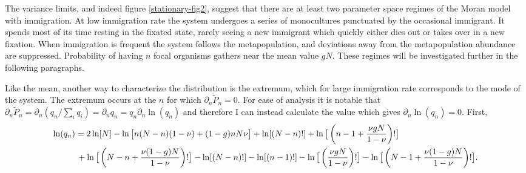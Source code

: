 The variance limits, and indeed figure \ref{stationary-fig2}, suggest that there are at least two parameter space regimes of the Moran model with immigration. 
At low immigration rate the system undergoes a series of monocultures punctuated by the occasional immigrant. It spends most of its time resting in the fixated state, rarely seeing a new immigrant which quickly either dies out or takes over in a new fixation. 
When immigration is frequent the system follows the metapopulation, and deviations away from the metapopulation abundance are suppressed. 
Probability of having $n$ focal organisms gathers near the mean value $g N$. 
These regimes will be investigated further in the following paragraphs. 

Like the mean, another way to characterize the distribution is the extremum, which for large immigration rate corresponds to the mode of the system. 
The extremum occurs at the $n$ for which $\partial_n \widetilde{P}_n = 0$. For ease of analysis it is notable that $\partial_n \widetilde{P}_n = \partial_n \left( q_n/\sum_i q_i \right) = \partial_n q_n = q_n \partial_n \ln(q_n)$ and therefore I can instead calculate the value which gives $\partial_n \ln(q_n)=0$. 
First,
\begin{align}
 \ln(q_n) &= 2\ln[N] - \ln\big[n(N-n)(1-\nu)+(1-g)n N\nu\big] + \ln[(N-n)!] + \ln\big[\left(n-1+\frac{\nu g N}{1-\nu}\right)!\big] \\
 		  &\, + \ln\big[\left(N-n+\frac{\nu (1-g) N}{1-\nu}\right)!\big] - \ln[(N-n)!] - \ln[(n-1)!] - \ln\big[\left(\frac{\nu g N}{1-\nu}\right)!\big] - \ln\big[\left(N-1+\frac{\nu (1-g) N}{1-\nu}\right)!\big] . \notag%
\end{align}
